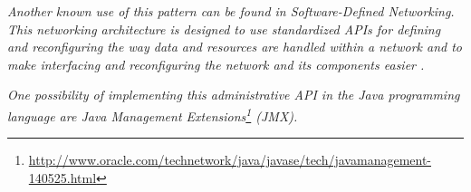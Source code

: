 \textit{Another known use of this pattern can be found in Software-Defined Networking. This networking architecture is designed to use standardized APIs for defining and reconfiguring the way data and resources are handled within a network and to make interfacing and reconfiguring the network and its components easier \cite{Kirkpatrick2013}.}

\textit{One possibility of implementing this administrative API in the Java programming language are Java Management Extensions\footnote{\url{http://www.oracle.com/technetwork/java/javase/tech/javamanagement-140525.html}} (JMX). }

%
%
%
